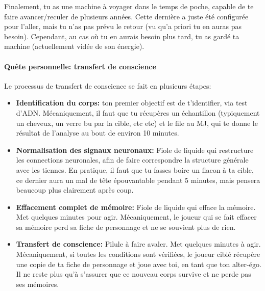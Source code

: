 {	\par Finalement, tu as une machine à voyager dans le temps de poche, capable de te faire avancer/reculer de plusieurs années. Cette dernière a juste été configurée pour l'aller, mais tu n'as pas prévu le retour (vu qu'a priori tu en auras pas besoin). Cependant, au cas où tu en aurais besoin plus tard, tu as gardé ta machine (actuellement vidée de son énergie).
	
	\paragraph{Quête personnelle: transfert de conscience} Le processus de transfert de conscience se fait en plusieurs étapes:
	\begin{itemize}
		\item \textbf{Identification du corps:} ton premier objectif est de t'identifier, via test d'ADN. Mécaniquement, il faut que tu récupères un échantillon (typiquement un cheveux, un verre bu par la cible, etc etc) et le file au MJ, qui te donne le résultat de l'analyse au bout de environ 10 minutes.
		
		\item \textbf{Normalisation des signaux neuronaux:} Fiole de liquide qui restructure les connections neuronales, afin de faire correspondre la structure générale avec les tiennes. En pratique, il faut que tu fasses boire un flacon à ta cible, ce dernier aura un mal de tête épouvantable pendant 5 minutes, mais pensera beaucoup plus clairement après coup.
		
		\item \textbf{Effacement complet de mémoire:} Fiole de liquide qui efface la mémoire. Met quelques minutes pour agir. Mécaniquement, le joueur qui se fait effacer sa mémoire perd sa fiche de personnage et ne se souvient plus de rien.
		
		\item \textbf{Transfert de conscience:} Pilule à faire avaler. Met quelques minutes à agir. Mécaniquement, si toutes les conditions sont vérifiées, le joueur ciblé récupère une copie de ta fiche de personnage et joue avec toi, en tant que ton alter-égo. Il ne reste plus qu'à s'assurer que ce nouveau corps survive et ne perde pas ses mémoires.
	\end{itemize}
}


